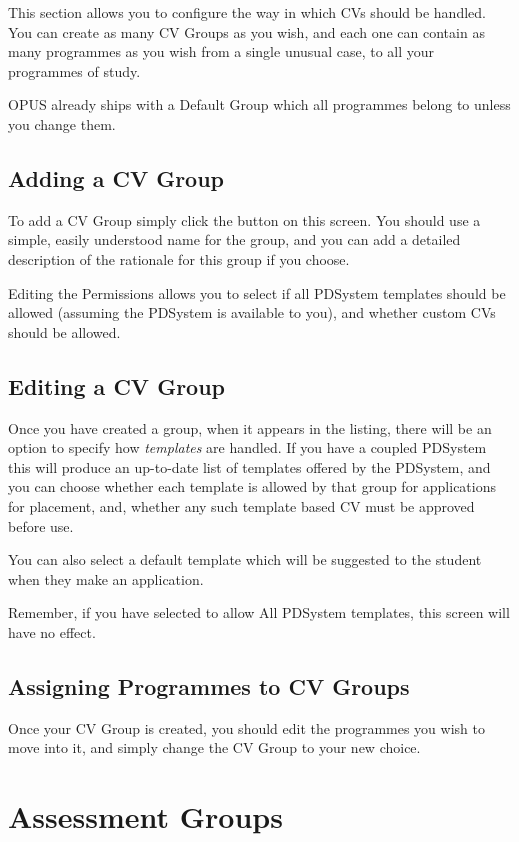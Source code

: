 \documentclass[12 pt]{book}
\begin{document}
This section allows you to configure the way in which CVs should be handled.
You can create as many CV Groups as you wish, and each one can contain as many
programmes as you wish from a single unusual case, to all your programmes of
study.

OPUS already ships with a Default Group which all programmes belong to unless
you change them.

\subsection{Adding a CV Group}

To add a CV Group simply click the  button on this screen. You should
use a simple, easily understood name for the group, and you can add a detailed
description of the rationale for this group if you choose.

Editing the Permissions allows you to select if all PDSystem templates should 
be allowed (assuming the PDSystem is available to you), and whether custom CVs
should be allowed.

\subsection{Editing a CV Group}

Once you have created a group, when it appears in the listing, there will be
an option to specify how \emph{templates} are handled. If you have a coupled
PDSystem this will produce an up-to-date list of templates offered by the
PDSystem, and you can choose whether each template is allowed by that group
for applications for placement, and, whether any such template based CV must 
be approved before use.

You can also select a default template which will be suggested to the student
when they make an application.

Remember, if you have selected to allow All PDSystem templates, this screen
will have no effect.

\subsection{Assigning Programmes to CV Groups}

Once your CV Group is created, you should edit the programmes you wish to move
into it, and simply change the CV Group to your new choice.

\section{Assessment Groups}
\end{document}
